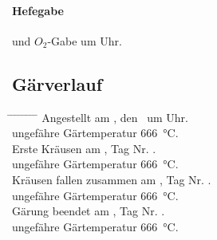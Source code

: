 \documentclass[12pt,oneside,a4paper]{scrartcl}
\begin{document}
\paragraph{Hefegabe} und $O_2$-Gabe um Uhr. 
%
\subsection*{Gärverlauf}
	\begin{tabbing}
		\hspace{1cm} \= \hspace{1cm} \= \hspace{1cm} \= \hspace{1cm} \= \hspace{1cm} \= \hspace{1cm} \= \hspace{1cm} \= \hspace{1cm} \= \kill
		\> Angestellt am , den  \ um  Uhr.\\
		\> \> ungefähre Gärtemperatur \SI{666}{\celsius}.\\
		\> Erste Kräusen am \hspace{4cm}, Tag Nr.\hspace{2.5cm} .\\
		\> \> ungefähre Gärtemperatur \SI{666}{\celsius}.\\
		\> Kräusen fallen zusammen am \hspace{4cm}, Tag Nr. \hspace{2.5cm}.\\
		\> \> ungefähre Gärtemperatur \SI{666}{\celsius}.\\
		\> Gärung beendet am \hspace{4cm}, Tag Nr. \hspace{2.5cm}.\\
		\> \> ungefähre Gärtemperatur \SI{666}{\celsius}.
	\end{tabbing}
%
\end{document}
